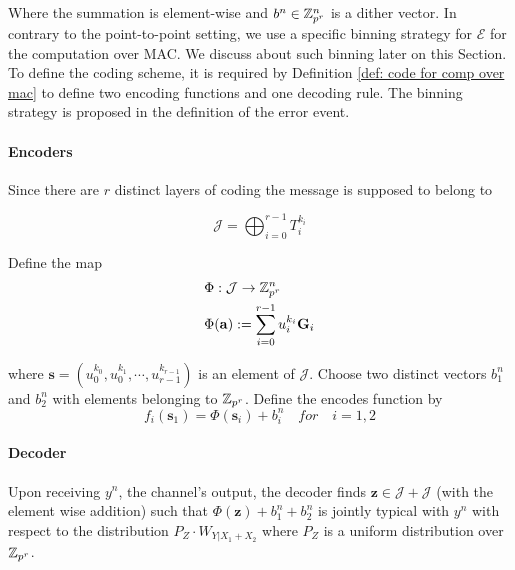 \documentclass[conference]{IEEEtran}
\theoremstyle{plain}
\theoremstyle{definition}
\theoremstyle{remark}
\begin{document}
Where the summation is element-wise and $b^n\in \mathbb{Z}_{p^r}^n$ is a dither vector.  In contrary to the point-to-point setting, we use a specific binning strategy for $\mathcal{E}$ for the computation over MAC. We discuss about such binning later on this Section.
To define the coding scheme, it is required by Definition \ref{def: code for comp over mac} to define two encoding functions and one decoding rule. The binning strategy is proposed in the definition of the error event.

\paragraph*{Encoders}

Since there are $r$ distinct layers of coding the message is supposed to belong to 

\begin{equation*}
\mathcal{J}=\bigoplus_{i=0}^{r-1} T_i^{k_i}
\end{equation*}

 Define the map 
\begin{align}\label{eq: phi_mac}
&\Phi :\mathcal{J} \rightarrow \mathbb{Z}_{p^r}^n\\\nonumber
& \Phi(\mathbf{a}):=\sum_{i=0}^{r-1} u_i^{k_i}\mathbf{G}_i 
\end{align}

where $\mathbf{s}=(u_0^{k_0},u_0^{k_1}, \cdots, u_{r-1}^{k_{r-1}})$ is an element of $\mathcal{J}$. Choose two distinct vectors $b_1^n$ and $b_2^n$ with elements belonging to $\mathbb{Z}_{p^r}$. Define the encodes function by 
\begin{equation*}
f_i(\mathbf{s}_1)=\Phi(\mathbf{s}_i)+b_i^n \quad  for \quad  i=1,2
\end{equation*}

\paragraph*{Decoder}
Upon receiving $y^n$, the channel's output, the decoder finds $\mathbf{z} \in \mathcal{J}+\mathcal{J}$ (with the element wise addition) such that $\Phi(\mathbf{z})+b_1^n+b_2^n$ is jointly typical with $y^n$ with respect to the distribution $P_Z \cdot W_{Y|X_1+X_2}$ where $P_Z$ is a uniform distribution over $\mathbb{Z}_{p^r}$. 
\end{document}
